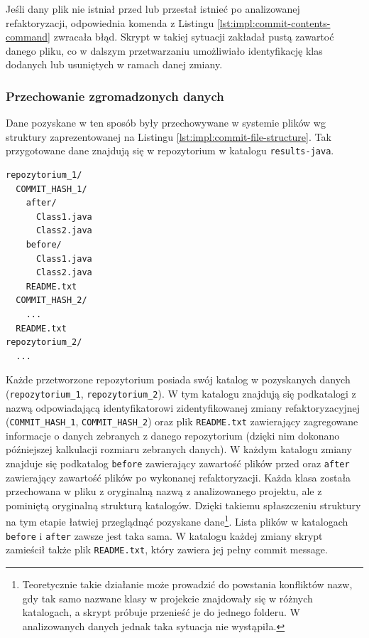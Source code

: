 \documentclass[12pt]{report}
\begin{document}
Jeśli dany plik nie istniał przed lub przestał istnieć po analizowanej refaktoryzacji, odpowiednia komenda z Listingu \ref{lst:impl:commit-contents-command} zwracała błąd. Skrypt w takiej sytuacji zakładał pustą zawartoć danego pliku, co w dalszym przetwarzaniu umożliwiało identyfikację klas dodanych lub usuniętych w ramach danej zmiany.

\subsubsection{Przechowanie zgromadzonych danych}
Dane pozyskane w ten sposób były przechowywane w systemie plików wg struktury zaprezentowanej na Listingu \ref{lst:impl:commit-file-structure}. Tak przygotowane dane znajdują się w repozytorium \cite{fracz:refactor-extractor} w katalogu \texttt{results-java}.

\begin{lstlisting}[frame=single,caption={Struktura danych przechowujących kod poddany refaktoryazji po przetworzeniu zidentyfikowanych commitów wprowadzających refaktoryzację},captionpos=b,label={lst:impl:commit-file-structure}]
repozytorium_1/
  COMMIT_HASH_1/
    after/
      Class1.java
      Class2.java
    before/
      Class1.java
      Class2.java
    README.txt
  COMMIT_HASH_2/
    ...
  README.txt
repozytorium_2/
  ...
\end{lstlisting}

Każde przetworzone repozytorium posiada swój katalog w pozyskanych danych (\texttt{repozytorium\_1}, \texttt{repozytorium\_2}). W tym katalogu znajdują się podkatalogi z nazwą odpowiadającą identyfikatorowi zidentyfikowanej zmiany refaktoryzacyjnej (\texttt{COMMIT\_HASH\_1}, \texttt{COMMIT\_HASH\_2}) oraz plik \texttt{README.txt} zawierający zagregowane informacje o danych zebranych z danego repozytorium (dzięki nim dokonano późniejszej kalkulacji rozmiaru zebranych danych). W każdym katalogu zmiany znajduje się podkatalog \texttt{before} zawierający zawartość plików przed oraz \texttt{after} zawierający zawartość plików po wykonanej refaktoryzacji. Każda klasa została przechowana w pliku z oryginalną nazwą z analizowanego projektu, ale z pominiętą oryginalną strukturą katalogów. Dzięki takiemu spłaszczeniu struktury na tym etapie łatwiej przeglądnąć pozyskane dane\footnote{Teoretycznie takie działanie może prowadzić do powstania konfliktów nazw, gdy tak samo nazwane klasy w projekcie znajdowały się w różnych katalogach, a skrypt próbuje przenieść je do jednego folderu. W analizowanych danych jednak taka sytuacja nie wystąpiła.}. Lista plików w katalogach \texttt{before} i \texttt{after} zawsze jest taka sama. W katalogu każdej zmiany skrypt zamieścił także plik \texttt{README.txt}, który zawiera jej pełny commit message.
\end{document}
